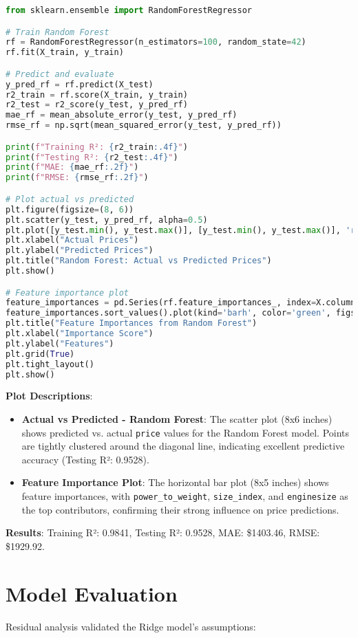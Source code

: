 \documentclass[12pt]{article}
\begin{document}
\begin{lstlisting}[language=Python, caption=Random Forest Code]
from sklearn.ensemble import RandomForestRegressor

# Train Random Forest
rf = RandomForestRegressor(n_estimators=100, random_state=42)
rf.fit(X_train, y_train)

# Predict and evaluate
y_pred_rf = rf.predict(X_test)
r2_train = rf.score(X_train, y_train)
r2_test = r2_score(y_test, y_pred_rf)
mae_rf = mean_absolute_error(y_test, y_pred_rf)
rmse_rf = np.sqrt(mean_squared_error(y_test, y_pred_rf))

print(f"Training R²: {r2_train:.4f}")
print(f"Testing R²: {r2_test:.4f}")
print(f"MAE: {mae_rf:.2f}")
print(f"RMSE: {rmse_rf:.2f}")

# Plot actual vs predicted
plt.figure(figsize=(8, 6))
plt.scatter(y_test, y_pred_rf, alpha=0.5)
plt.plot([y_test.min(), y_test.max()], [y_test.min(), y_test.max()], 'r--')
plt.xlabel("Actual Prices")
plt.ylabel("Predicted Prices")
plt.title("Random Forest: Actual vs Predicted Prices")
plt.show()

# Feature importance plot
feature_importances = pd.Series(rf.feature_importances_, index=X.columns)
feature_importances.sort_values().plot(kind='barh', color='green', figsize=(8,5))
plt.title("Feature Importances from Random Forest")
plt.xlabel("Importance Score")
plt.ylabel("Features")
plt.grid(True)
plt.tight_layout()
plt.show()
\end{lstlisting}

\textbf{Plot Descriptions}:
\begin{itemize}
    \item \textbf{Actual vs Predicted - Random Forest}: The scatter plot (8x6 inches) shows predicted vs. actual \texttt{price} values for the Random Forest model. Points are tightly clustered around the diagonal line, indicating excellent predictive accuracy (Testing R²: 0.9528).
    \item \textbf{Feature Importance Plot}: The horizontal bar plot (8x5 inches) shows feature importances, with \texttt{power\_to\_weight}, \texttt{size\_index}, and \texttt{enginesize} as the top contributors, confirming their strong influence on price predictions.
\end{itemize}

\textbf{Results}: Training R²: 0.9841, Testing R²: 0.9528, MAE: \$1403.46, RMSE: \$1929.92.

\section{Model Evaluation}
Residual analysis validated the Ridge model's assumptions:
\end{document}
